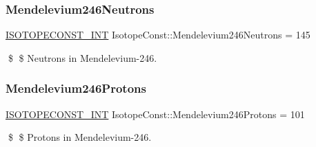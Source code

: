 \subsubsection{\texorpdfstring{Mendelevium246\+Neutrons}{Mendelevium246Neutrons}}
{\footnotesize\ttfamily \mbox{\hyperlink{group___isotope_const-_macros_ga5f18360b3e99483a35c32d789e62621c}{I\+S\+O\+T\+O\+P\+E\+C\+O\+N\+S\+T\+\_\+\+I\+NT}} Isotope\+Const\+::\+Mendelevium246\+Neutrons = 145}

\$ \$ Neutrons in Mendelevium-\/246. \mbox{\label{group___isotope_const-_mendelevium-_md246_ga7c91f868084d2c52c7cfaa4d265d2c24}} 
\subsubsection{\texorpdfstring{Mendelevium246\+Protons}{Mendelevium246Protons}}
{\footnotesize\ttfamily \mbox{\hyperlink{group___isotope_const-_macros_ga5f18360b3e99483a35c32d789e62621c}{I\+S\+O\+T\+O\+P\+E\+C\+O\+N\+S\+T\+\_\+\+I\+NT}} Isotope\+Const\+::\+Mendelevium246\+Protons = 101}

\$ \$ Protons in Mendelevium-\/246. 